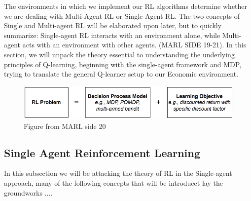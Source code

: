 \documentclass{article}
\begin{document}
\newline 
\newline
The environments in which we implement our RL algorithms determine whether we are dealing with Multi-Agent RL or Single-Agent RL. The two concepts of Single and Multi-agent RL will be elaborated upon later, but to quickly summarize: Single-agent RL interacts with an environment alone, while  Multi-agent acts with an environment with other agents. (MARL SIDE 19-21).
In this section, we will unpack the theory essential to understanding the underlying principles of Q-learning, beginning with the single-agent framework and MDP, trying to translate the general Q-learner setup to our Economic environment. 
\begin{figure}
    \centering
    \includegraphics[width=0.5\linewidth]{MARLside20.png}
    \caption{Figure from MARL side 20 }
    \label{fig:MARLside20}
\end{figure}
\subsection{Single Agent Reinforcement Learning}
In this subsection we will be attacking the theory of RL in the Single-agent approach, many of the following concepts that will be introducet  lay the groundworks ....
\end{document}
